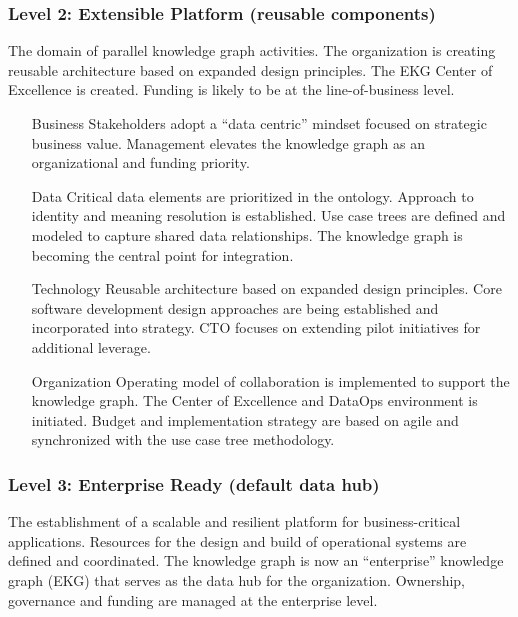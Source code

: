 \subsubsection{Level 2: Extensible Platform (reusable components)}

The domain of parallel knowledge graph activities.
The organization is creating reusable architecture based on expanded design principles.
The EKG Center of Excellence is created.
Funding is likely to be at the line-of-business level.

\begin{itemize}[leftmargin=1in]

    \item[Business]     Stakeholders adopt a “data centric” mindset focused on strategic business value.
                        Management elevates the knowledge graph as an organizational and funding priority.
    \item[Data]         Critical data elements are prioritized in the ontology.
                        Approach to identity and meaning resolution is established.
                        Use case trees are defined and modeled to capture shared data relationships.
                        The knowledge graph is becoming the central point for integration.
    \item[Technology]   Reusable architecture based on expanded design principles.
                        Core software development design approaches are being established and incorporated
                        into strategy.
                        CTO focuses on extending pilot initiatives for additional leverage.
    \item[Organization] Operating model of collaboration is implemented to support the knowledge graph.
                        The Center of Excellence and DataOps environment is initiated.
                        Budget and implementation strategy are based on agile and synchronized with the
                        use case tree methodology.

\end{itemize}

\subsubsection{Level 3: Enterprise Ready (default data hub)}

The establishment of a scalable and resilient platform for business-critical applications.
Resources for the design and build of operational systems are defined and coordinated.
The knowledge graph is now an “enterprise” knowledge graph (EKG) that serves as the data hub for the organization.
Ownership, governance and funding are managed at the enterprise level.

